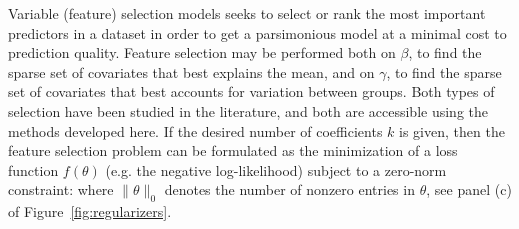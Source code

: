 Variable (feature) selection models seeks to select or rank the most important predictors in a dataset in order to get a parsimonious model at a minimal cost to prediction quality. 
Feature selection may be performed both on $\beta$, to find the sparse set of covariates that best explains the mean, and on $\gamma$, to find the sparse set of covariates that best accounts for 
variation between groups. Both types of selection have been studied in the literature, and both are accessible using the methods developed here.
If the desired number of coefficients $k$ is given, then the feature selection problem can be formulated as the minimization of a loss function $f(\theta)$ (e.g. the negative log-likelihood) subject to a zero-norm constraint:
where $\|\theta\|_0$ denotes the number of nonzero entries in $\theta$, see panel (c) of Figure~\ref{fig:regularizers}.




